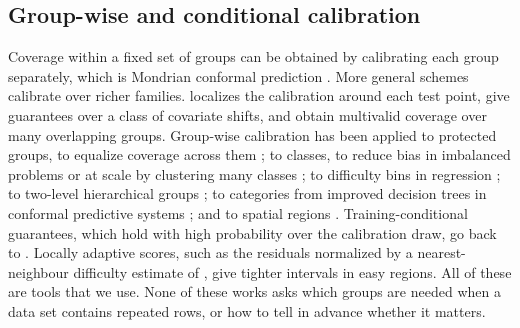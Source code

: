 \subsection{Group-wise and conditional calibration}
Coverage within a fixed set of groups can be obtained by calibrating each group separately, which is Mondrian conformal prediction \citep{vovk2022}. More general schemes calibrate over richer families. \citet{guan2023} localizes the calibration around each test point, \citet{gibbs2025} give guarantees over a class of covariate shifts, and \citet{bastani2022} obtain multivalid coverage over many overlapping groups. Group-wise calibration has been applied to protected groups, to equalize coverage across them \citep{romano2020b}; to classes, to reduce bias in imbalanced problems \citep{lofstrom2015} or at scale by clustering many classes \citep{ding2023}; to difficulty bins in regression \citep{bostrom2020}; to two-level hierarchical groups \citep{dunn2023}; to categories from improved decision trees in conformal predictive systems \citep{zhang2026}; and to spatial regions \citep{seo2026}.
Training-conditional guarantees, which hold with high probability over the calibration draw, go back to \citet{vovk2012}. Locally adaptive scores, such as the residuals normalized by a nearest-neighbour difficulty estimate of \citet{papadopoulos2011}, give tighter intervals in easy regions. All of these are tools that we use. None of these works asks which groups are needed when a data set contains repeated rows, or how to tell in advance whether it matters.

